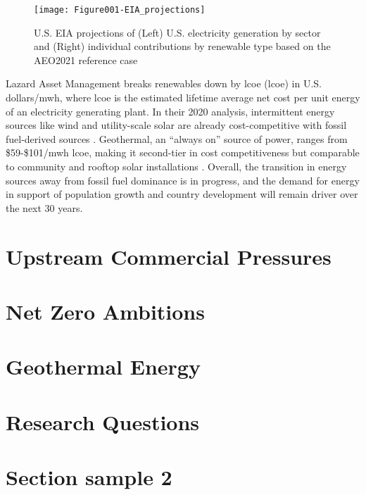 \begin{figure}[htp]
\centering
\texttt{[image: Figure001-EIA\_projections]}
\caption[U.S. EIA projections based on the AEO2021 reference case]{U.S. EIA projections of (Left) U.S. electricity generation by sector and (Right) individual contributions by renewable type based on the AEO2021 reference case \protect\citep{us_energy_information_administration_annual_2021}}
\label{fig:eia_2021_projections}
\end{figure}

Lazard Asset Management breaks renewables down by \acrlong{lcoe} (\acrshort{lcoe}) in U.S. dollars/\acrshort{mwh}, where \acrshort{lcoe} is the estimated lifetime average net cost per unit energy of an electricity generating plant. In their 2020 analysis, intermittent energy sources like wind and utility-scale solar are already cost-competitive with fossil fuel-derived sources \citep{lazard_lazards_2020}. Geothermal, an “always on” source of power, ranges from \$59-\$101/\acrshort{mwh}  \acrshort{lcoe}, making it second-tier in cost competitiveness but comparable to community and rooftop solar installations \citep{lazard_lazards_2020}. Overall, the transition in energy sources away from fossil fuel dominance is in progress, and the demand for energy in support of population growth and country development will remain driver over the next 30 years.


\section{Upstream Commercial Pressures}\label{ch1:upstream}


\section{Net Zero Ambitions}\label{ch1:netzero}


\section{Geothermal Energy}\label{ch1:geothermal}

\section{Research Questions}\label{ch1:researchqs}


\section{Section sample 2}\label{ch1:sec}

